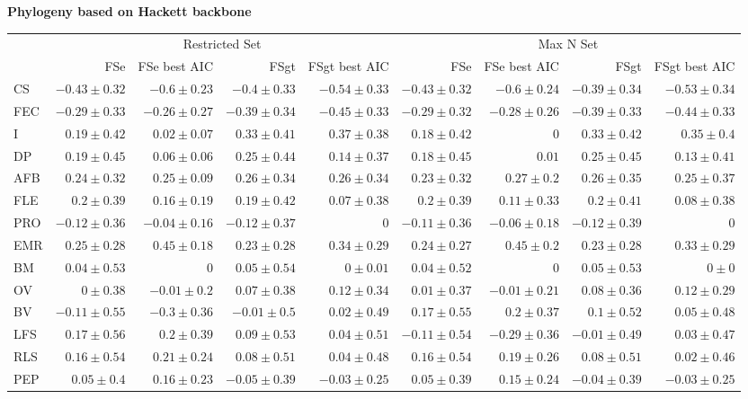 \begin{landscape}
\begin{table}
\begin{footnotesize}
\textbf{Phylogeny based on Hackett backbone}

\begin{tabular}{@{}l|rrrr|rrrr@{}}
\toprule
  & \multicolumn{4}{c|}{Restricted Set} & \multicolumn{4}{c}{Max N Set}\\
  & FSe & FSe best AIC & FSgt & FSgt best AIC & FSe & FSe best AIC & FSgt & FSgt best AIC\\
\midrule
CS & $-0.43 \pm 0.32$ & $-0.6 \pm 0.23$ & $-0.4 \pm 0.33$ & $-0.54 \pm 0.33$ & $-0.43 \pm 0.32$ & $-0.6 \pm 0.24$ & $-0.39 \pm 0.34$ & $-0.53 \pm 0.34$\\
FEC & $-0.29 \pm 0.33$ & $-0.26 \pm 0.27$ & $-0.39 \pm 0.34$ & $-0.45 \pm 0.33$ & $-0.29 \pm 0.32$ & $-0.28 \pm 0.26$ & $-0.39 \pm 0.33$ & $-0.44 \pm 0.33$\\
I & $0.19 \pm 0.42$ & $0.02 \pm 0.07$ & $0.33 \pm 0.41$ & $0.37 \pm 0.38$ & $0.18 \pm 0.42$ & $0$ & $0.33 \pm 0.42$ & $0.35 \pm 0.4$\\
DP & $0.19 \pm 0.45$ & $0.06 \pm 0.06$ & $0.25 \pm 0.44$ & $0.14 \pm 0.37$ & $0.18 \pm 0.45$ & $0.01$ & $0.25 \pm 0.45$ & $0.13 \pm 0.41$\\
AFB & $0.24 \pm 0.32$ & $0.25 \pm 0.09$ & $0.26 \pm 0.34$ & $0.26 \pm 0.34$ & $0.23 \pm 0.32$ & $0.27 \pm 0.2$ & $0.26 \pm 0.35$ & $0.25 \pm 0.37$\\
FLE & $0.2 \pm 0.39$ & $0.16 \pm 0.19$ & $0.19 \pm 0.42$ & $0.07 \pm 0.38$ & $0.2 \pm 0.39$ & $0.11 \pm 0.33$ & $0.2 \pm 0.41$ & $0.08 \pm 0.38$\\
PRO & $-0.12 \pm 0.36$ & $-0.04 \pm 0.16$ & $-0.12 \pm 0.37$ & $0$ & $-0.11 \pm 0.36$ & $-0.06 \pm 0.18$ & $-0.12 \pm 0.39$ & $0$\\
EMR & $0.25 \pm 0.28$ & $0.45 \pm 0.18$ & $0.23 \pm 0.28$ & $0.34 \pm 0.29$ & $0.24 \pm 0.27$ & $0.45 \pm 0.2$ & $0.23 \pm 0.28$ & $0.33 \pm 0.29$\\
BM & $0.04 \pm 0.53$ & $0$ & $0.05 \pm 0.54$ & $0 \pm 0.01$ & $0.04 \pm 0.52$ & $0$ & $0.05 \pm 0.53$ & $0 \pm 0$\\
OV & $0 \pm 0.38$ & $-0.01 \pm 0.2$ & $0.07 \pm 0.38$ & $0.12 \pm 0.34$ & $0.01 \pm 0.37$ & $-0.01 \pm 0.21$ & $0.08 \pm 0.36$ & $0.12 \pm 0.29$\\
BV & $-0.11 \pm 0.55$ & $-0.3 \pm 0.36$ & $-0.01 \pm 0.5$ & $0.02 \pm 0.49$ & $0.17 \pm 0.55$ & $0.2 \pm 0.37$ & $0.1 \pm 0.52$ & $0.05 \pm 0.48$\\
LFS & $0.17 \pm 0.56$ & $0.2 \pm 0.39$ & $0.09 \pm 0.53$ & $0.04 \pm 0.51$ & $-0.11 \pm 0.54$ & $-0.29 \pm 0.36$ & $-0.01 \pm 0.49$ & $0.03 \pm 0.47$\\
RLS & $0.16 \pm 0.54$ & $0.21 \pm 0.24$ & $0.08 \pm 0.51$ & $0.04 \pm 0.48$ & $0.16 \pm 0.54$ & $0.19 \pm 0.26$ & $0.08 \pm 0.51$ & $0.02 \pm 0.46$\\
PEP & $0.05 \pm 0.4$ & $0.16 \pm 0.23$ & $-0.05 \pm 0.39$ & $-0.03 \pm 0.25$ & $0.05 \pm 0.39$ & $0.15 \pm 0.24$ & $-0.04 \pm 0.39$ & $-0.03 \pm 0.25$\\
\bottomrule
\end{tabular}

\end{footnotesize}
\end{table}
\end{landscape}


